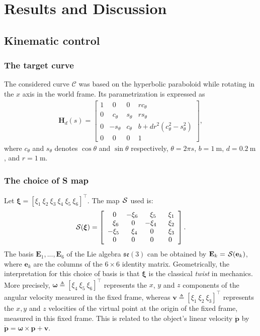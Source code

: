 \chapter{Results and Discussion}
\section{Kinematic control}
\subsection{The target curve}
The considered curve $\mathcal{C}$ was based on the hyperbolic paraboloid while rotating in the $x$ axis in the world frame. Its parametrization is expressed as 
\begin{align}
    \mathbf{H}_d(s) = \begin{bmatrix}
        1 & \ \ 0 & 0 & rc_\theta\\
        0 & \ \ c_\theta & s_\theta & rs_\theta\\
        0 & -s_\theta & c_\theta & b + dr^2(c_\theta^2 - s_\theta^2)\\
        0 & \ \ 0 & 0 & 1
    \end{bmatrix},
\end{align}
where $c_\theta$ and $s_\theta$ denotes $\cos\theta$ and $\sin\theta$ respectively, $\theta = 2\pi s$, $b=\qty{1}{\meter}$, $d=\qty{0.2}{\meter}$, and $r=\qty{1}{\meter}$.

\subsection{The choice of S map}
Let $\boldsymbol{\xi} = [\xi_1 \ \xi_2 \ \xi_3 \ \xi_4 \ \xi_5 \ \xi_6]^\top$. The map $\SL$ used is:
\begin{equation}
    \SL[\boldsymbol{\xi}] = \left[\begin{array}{cccc} 
    \ 0 & -\xi_6 & \ \ \xi_5 & \ \ \xi_1 \\
    \ \ \xi_6 & \ 0 & -\xi_4 & \ \ \xi_2 \\
    -\xi_5 & \ \ \xi_4 & \ 0 & \ \ \xi_3 \\
    \ 0 & \ 0 & \ 0 & \ 0
    \end{array}\right].
\end{equation}
The basis $\mathbf{E}_1, ... ,\mathbf{E}_6$ of the Lie algebra $\mathfrak{se}(3)$ can be obtained by $\mathbf{E}_k = \SL[\mathbf{e}_k]$, where $\mathbf{e}_k$ are the columns of the $6 \times 6$ identity matrix. Geometrically, the interpretation for this choice of basis is that $\boldsymbol{\xi}$ is the classical \emph{twist} in mechanics. More precisely, $\boldsymbol{\omega} \triangleq [\xi_4 \  \xi_5 \  \xi_6]^\top$ represents the $x$, $y$ and $z$ components of the angular  velocity  measured in the fixed frame, whereas $\mathbf{v} \triangleq [\xi_1 \  \xi_2 \  \xi_3]^\top$ represents the $x, y$ and $z$ velocities of the virtual point at the origin of the fixed frame, measured in this fixed frame. This is related to the object's linear velocity $\dot{\mathbf{p}}$  by $\dot{\mathbf{p}} = \boldsymbol{\omega} \times \mathbf{p} + \mathbf{v}$.

